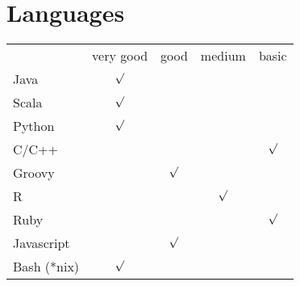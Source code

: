 \section{Languages}
\setlength{\tabcolsep}{12pt}
{
\begin{tabular}{l*{4}{c}}
& very good & good & medium & basic \\
Java & $ \surd $ & & & \\
Scala & $ \surd $ & & & \\
Python & $ \surd $ & & & \\
C/C++ & & & & $\surd$ \\
Groovy & & $\surd$ & &  \\
R & & & $\surd$ &  \\
Ruby & & & & $\surd$ \\
Javascript & & $\surd$ & & \\
Bash (*nix) & $\surd$ & & &  \\
\end{tabular}
}{}

